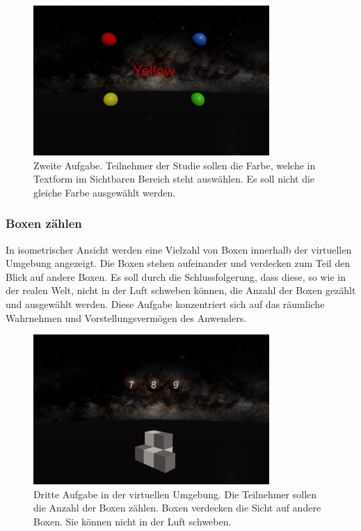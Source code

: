 \begin{figure}
	\centering
	\includegraphics[width=0.8\textwidth]{./images/matching.png}
	\caption{Zweite Aufgabe. Teilnehmer der Studie sollen die Farbe, welche in Textform im Sichtbaren Bereich steht auswählen. Es soll nicht die gleiche Farbe ausgewählt werden.}
	\label{fig:matching}
\end{figure}

\subsubsection{Boxen zählen} 
In isometrischer Ansicht werden eine Vielzahl von Boxen innerhalb der virtuellen Umgebung angezeigt. Die Boxen stehen aufeinander und verdecken zum Teil den Blick auf andere Boxen. Es soll durch die Schlussfolgerung, dass diese, so wie in der realen Welt, nicht in der Luft schweben können, die Anzahl der Boxen gezählt und ausgewählt werden. Diese Aufgabe konzentriert sich auf das räumliche Wahrnehmen und Vorstellungsvermögen des Anwenders.

\begin{figure}
	\centering
	\includegraphics[width=0.8\textwidth]{./images/counting.png}
	\caption{Dritte Aufgabe in der virtuellen Umgebung. Die Teilnehmer sollen die Anzahl der Boxen zählen. Boxen verdecken die Sicht auf andere Boxen. Sie können nicht in der Luft schweben.}
	\label{fig:counting}
\end{figure}

